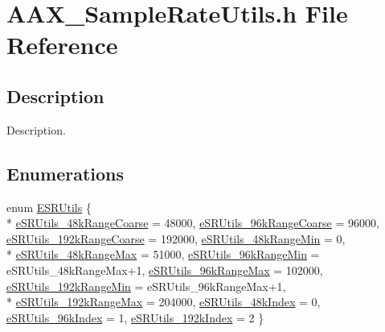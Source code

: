 \hypertarget{a00291}{}\section{A\+A\+X\+\_\+\+Sample\+Rate\+Utils.\+h File Reference}
\label{a00291}


\subsection{Description}
Description. 

\subsection*{Enumerations}
\begin{DoxyCompactItemize}
\item 
enum \hyperlink{a00291_a65f189058b3204334c2c13d368d8ce3e}{E\+S\+R\+Utils} \{ \\*
\hyperlink{a00291_a65f189058b3204334c2c13d368d8ce3eae974abf255ac5507a0c8163d0ebf9bcb}{e\+S\+R\+Utils\+\_\+48k\+Range\+Coarse} = 48000, 
\hyperlink{a00291_a65f189058b3204334c2c13d368d8ce3ea376e9c46e970aa93e789445670b1d45f}{e\+S\+R\+Utils\+\_\+96k\+Range\+Coarse} = 96000, 
\hyperlink{a00291_a65f189058b3204334c2c13d368d8ce3eadc3653ea09f8a83c8222afc5a386e28f}{e\+S\+R\+Utils\+\_\+192k\+Range\+Coarse} = 192000, 
\hyperlink{a00291_a65f189058b3204334c2c13d368d8ce3eaec0fdd5b4e84f205ff16852740f18ea2}{e\+S\+R\+Utils\+\_\+48k\+Range\+Min} = 0, 
\\*
\hyperlink{a00291_a65f189058b3204334c2c13d368d8ce3ea1676c77c5473c1f0b7e820150869d413}{e\+S\+R\+Utils\+\_\+48k\+Range\+Max} = 51000, 
\hyperlink{a00291_a65f189058b3204334c2c13d368d8ce3ea858679d6660025243d5e9b0f06797f7f}{e\+S\+R\+Utils\+\_\+96k\+Range\+Min} = e\+S\+R\+Utils\+\_\+48k\+Range\+Max+1, 
\hyperlink{a00291_a65f189058b3204334c2c13d368d8ce3eabc1086d9707a35f99ed52f59b6b14934}{e\+S\+R\+Utils\+\_\+96k\+Range\+Max} = 102000, 
\hyperlink{a00291_a65f189058b3204334c2c13d368d8ce3ea675774f7e038af726de7561dcd3f314b}{e\+S\+R\+Utils\+\_\+192k\+Range\+Min} = e\+S\+R\+Utils\+\_\+96k\+Range\+Max+1, 
\\*
\hyperlink{a00291_a65f189058b3204334c2c13d368d8ce3eaac7e670dc4a1cc396be2fd024f6a237f}{e\+S\+R\+Utils\+\_\+192k\+Range\+Max} = 204000, 
\hyperlink{a00291_a65f189058b3204334c2c13d368d8ce3eaa501e86b22b5be0d003d73ad5fd4e1f5}{e\+S\+R\+Utils\+\_\+48k\+Index} = 0, 
\hyperlink{a00291_a65f189058b3204334c2c13d368d8ce3ea0cb96ccca8f89676f461df0054ee2678}{e\+S\+R\+Utils\+\_\+96k\+Index} = 1, 
\hyperlink{a00291_a65f189058b3204334c2c13d368d8ce3eafdb7fb04ad5032eeccbeec8d26a4a04c}{e\+S\+R\+Utils\+\_\+192k\+Index} = 2
 \}
\end{DoxyCompactItemize}
